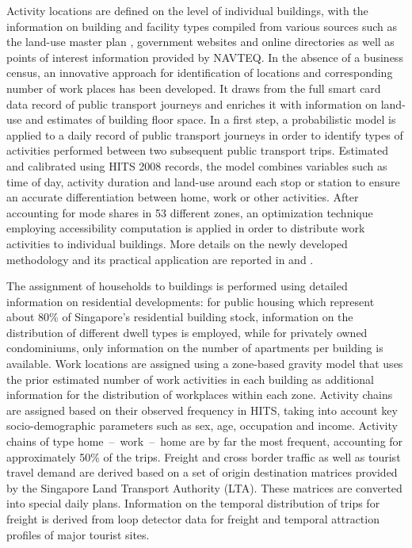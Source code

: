 Activity locations are defined on the level of individual buildings, with the information on building and facility types compiled from various sources such as the land-use master plan \cite[][]{URA_Rep_URA_2008}, government websites and online directories as well as points of interest information provided by NAVTEQ. In the absence of a business census, an innovative approach for identification of locations and corresponding number of work places has been developed. It draws from the full smart card data record of public transport journeys and enriches it with information on land-use and estimates of building floor space. In a first step, a probabilistic model is applied to a daily record of public transport journeys in order to identify types of activities performed between two subsequent public transport trips. Estimated and calibrated using HITS 2008 records, the model combines variables such as time of day, activity duration and land-use around each stop or station to ensure an accurate differentiation between home, work or other activities. After accounting for mode shares in 53 different zones, an optimization technique employing accessibility computation is applied in order to distribute work activities to individual buildings.  More details on the newly developed methodology and its practical application are reported in \citet[][]{ChakirovErath_IATBR_2012} and \citet[][]{OrdonezErath_TRR_2013}. 

The assignment of households to buildings is performed using detailed information on residential developments: for public housing which represent about 80\% of Singapore's residential building stock, information on the distribution of different dwell types is employed, while for privately owned condominiums, only information on the number of apartments per building is available. Work locations are assigned using a zone-based gravity model that uses the prior estimated number of work activities in each building as additional information for the distribution of workplaces within each zone. Activity chains are assigned based on their observed frequency in HITS, taking into account key socio-demographic parameters such as sex, age, occupation and income. Activity chains of type home~--~work~--~home are by far the most frequent, accounting for approximately 50\% of the trips.
Freight and cross border traffic as well as tourist travel demand are derived based on a set of origin destination matrices provided by the Singapore Land Transport Authority (LTA). These matrices are converted into special daily plans. Information on the temporal distribution of trips for freight is derived from loop detector data for freight and temporal attraction profiles of major tourist sites.


